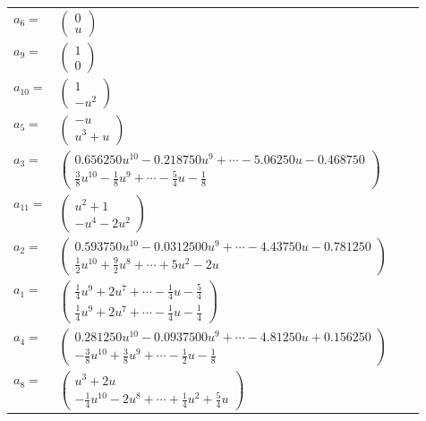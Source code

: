 \documentclass[1p]{elsarticle_modified}
\theoremstyle{definition}
\begin{document}
\begin{tabular}{m{7pt} m{180pt} m{7pt} m{180pt} }
\flushright $a_{6}=$&$\begin{pmatrix}0\\u\end{pmatrix}$ \\
\flushright $a_{9}=$&$\begin{pmatrix}1\\0\end{pmatrix}$ \\
\flushright $a_{10}=$&$\begin{pmatrix}1\\- u^2\end{pmatrix}$ \\
\flushright $a_{5}=$&$\begin{pmatrix}- u\\u^3+u\end{pmatrix}$ \\
\flushright $a_{3}=$&$\begin{pmatrix}0.656250 u^{10}-0.218750 u^{9}+\cdots-5.06250 u-0.468750\\\frac{3}{8} u^{10}-\frac{1}{8} u^9+\cdots-\frac{5}{4} u-\frac{1}{8}\end{pmatrix}$ \\
\flushright $a_{11}=$&$\begin{pmatrix}u^2+1\\- u^4-2 u^2\end{pmatrix}$ \\
\flushright $a_{2}=$&$\begin{pmatrix}0.593750 u^{10}-0.0312500 u^{9}+\cdots-4.43750 u-0.781250\\\frac{1}{2} u^{10}+\frac{9}{2} u^8+\cdots+5 u^2-2 u\end{pmatrix}$ \\
\flushright $a_{1}=$&$\begin{pmatrix}\frac{1}{4} u^9+2 u^7+\cdots-\frac{1}{4} u-\frac{5}{4}\\\frac{1}{4} u^9+2 u^7+\cdots-\frac{1}{4} u-\frac{1}{4}\end{pmatrix}$ \\
\flushright $a_{4}=$&$\begin{pmatrix}0.281250 u^{10}-0.0937500 u^{9}+\cdots-4.81250 u+0.156250\\-\frac{3}{8} u^{10}+\frac{3}{8} u^9+\cdots-\frac{1}{2} u-\frac{1}{8}\end{pmatrix}$ \\
\flushright $a_{8}=$&$\begin{pmatrix}u^3+2 u\\-\frac{1}{4} u^{10}-2 u^8+\cdots+\frac{1}{4} u^2+\frac{5}{4} u\end{pmatrix}$ \\

\end{tabular}
\end{document}

